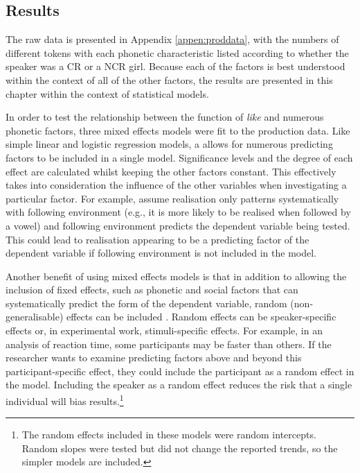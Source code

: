 \subsection{Results}\label{sec:prodresults}

The raw data is presented in Appendix \ref{appen:proddata}, with the numbers of different tokens with each phonetic characteristic listed according to whether the speaker was a CR or a NCR girl. Because each of the factors is best understood within the context of all of the other factors, the results are presented in this chapter within the context of statistical models.

In order to test the relationship between the function of \textit{like} and numerous phonetic factors, three mixed effects models were fit to the production data. Like simple linear and logistic regression models, a  allows for numerous predicting factors to be included in a single model. Significance levels and the degree of each effect are calculated whilst keeping the other factors constant. This effectively takes into consideration the influence of the other variables when investigating a particular factor. For example, assume  realisation only patterns systematically with following environment (e.g., it is more likely to be realised when followed by a vowel) and following environment predicts the dependent variable being tested. This could lead to  realisation appearing to be a predicting factor of the dependent variable if following environment is not included in the model. 

Another benefit of using mixed effects models is that in addition to allowing the inclusion of fixed effects, such as phonetic and social factors that can systematically predict the form of the dependent variable, random (non-generalisable) effects can be included \citep[263-326]{baayen2008}.  Random effects can be speaker-specific effects or, in experimental work, stimuli-specific effects. For example, in an analysis of reaction time, some participants may be faster than others. If the researcher wants to examine predicting factors above and beyond this participant-specific effect, they could include the participant as a random effect in the model. Including the speaker as a random effect reduces the risk that a single individual will bias results.\footnote{The random effects included in these models were random intercepts. Random slopes were tested but did not change the reported trends, so the simpler models are included.} 

